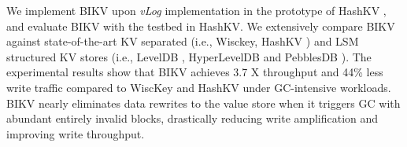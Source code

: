 \documentclass[sigconf]{acmart}
\begin{document}

We implement BIKV upon \textit{vLog} implementation in the prototype of HashKV \cite{HashKV}, and evaluate BIKV with the testbed in HashKV. We extensively compare BIKV against state-of-the-art KV separated (i.e., Wisckey, HashKV {}) and LSM structured KV stores (i.e., LevelDB \cite{LevelDB}, HyperLevelDB \cite{HyperLevelDB} and PebblesDB \cite{PebblesDB}). The experimental results show that BIKV achieves 3.7 X throughput and 44\% less write traffic compared to WiscKey and HashKV under GC-intensive workloads. BIKV nearly eliminates data rewrites to the value store when it triggers GC with abundant entirely invalid blocks, drastically reducing write amplification and improving write throughput.


\end{document}
